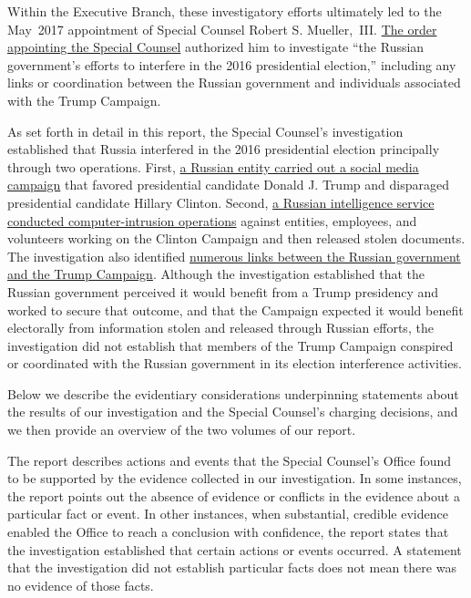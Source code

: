 Within the Executive Branch, these investigatory efforts ultimately led to the May~2017 appointment of Special Counsel Robert S. Mueller,~III\null.
\hyperlink{section.3.1}{The order appointing the Special Counsel} authorized him to investigate ``the Russian government's efforts to interfere in the 2016 presidential election,'' including any links or coordination between the Russian government and individuals associated with the Trump Campaign.

As set forth in detail in this report, the Special Counsel's investigation established that Russia interfered in the 2016 presidential election principally through two operations.
First, \hyperlink{section.1.2}{a Russian entity carried out a social media campaign} that favored presidential candidate Donald J. Trump and disparaged presidential candidate Hillary Clinton.
Second, \hyperlink{section.1.3}{a Russian intelligence service conducted computer-intrusion operations} against entities, employees, and volunteers working on the Clinton Campaign and then released stolen documents.
The investigation also identified \hyperlink{section.1.4}{numerous links between the Russian government and the Trump Campaign}.
Although the investigation established that the Russian government perceived it would benefit from a Trump presidency and worked to secure that outcome, and that the Campaign expected it would benefit electorally from information stolen and released through Russian efforts, the investigation did not establish that members of the Trump Campaign conspired or coordinated with the Russian government in its election interference activities.

\hr

Below we describe the evidentiary considerations underpinning statements about the results of our investigation and the Special Counsel's charging decisions, and we then provide an overview of the two volumes of our report.

The report describes actions and events that the Special Counsel's Office found to be supported by the evidence collected in our investigation.
In some instances, the report points out the absence of evidence or conflicts in the evidence about a particular fact or event.
In other instances, when substantial, credible evidence enabled the Office to reach a conclusion with confidence, the report states that the investigation established that certain actions or events occurred.
A statement that the investigation did not establish particular facts does not mean there was no evidence of those facts.

